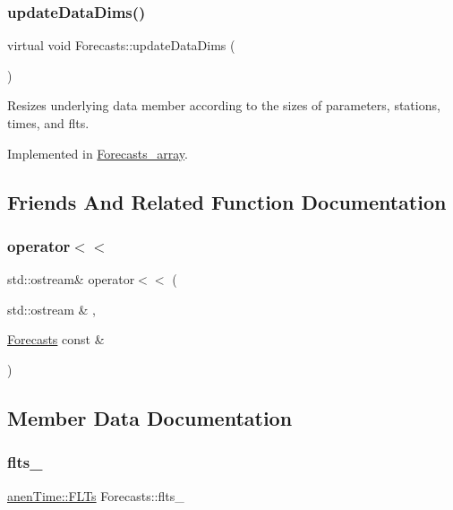 \subsubsection{\texorpdfstring{update\+Data\+Dims()}{updateDataDims()}}
{\footnotesize\ttfamily virtual void Forecasts\+::update\+Data\+Dims (\begin{DoxyParamCaption}{ }\end{DoxyParamCaption})\hspace{0.3cm}{\ttfamily [pure virtual]}}

Resizes underlying data member according to the sizes of parameters, stations, times, and flts. 

Implemented in \mbox{\hyperlink{class_forecasts__array_ab3fc780bb6a5cbf132457c8c336bc777}{Forecasts\+\_\+array}}.



\subsection{Friends And Related Function Documentation}
\mbox{\label{class_forecasts_a42c14120042eae287169092654f5b6c8}} 
\subsubsection{\texorpdfstring{operator$<$$<$}{operator<<}}
{\footnotesize\ttfamily std\+::ostream\& operator$<$$<$ (\begin{DoxyParamCaption}\item[{std\+::ostream \&}]{,  }\item[{\mbox{\hyperlink{class_forecasts}{Forecasts}} const \&}]{ }\end{DoxyParamCaption})\hspace{0.3cm}{\ttfamily [friend]}}



\subsection{Member Data Documentation}
\mbox{\label{class_forecasts_ace7fb459c34db19dfb77bc6861f9cdf5}} 
\subsubsection{\texorpdfstring{flts\+\_\+}{flts\_}}
{\footnotesize\ttfamily \mbox{\hyperlink{classanen_time_1_1_f_l_ts}{anen\+Time\+::\+F\+L\+Ts}} Forecasts\+::flts\+\_\+\hspace{0.3cm}{\ttfamily [protected]}}

